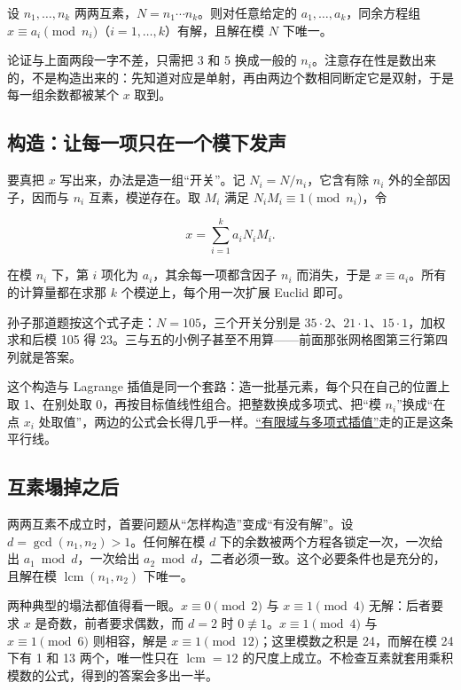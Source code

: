 \begin{theorem}[中国剩余定理]
设 \(n_1,\dots,n_k\) 两两互素，\(N=n_1\cdots n_k\)。则对任意给定的 \(a_1,\dots,a_k\)，同余方程组 \(x\equiv a_i\pmod{n_i}\)（\(i=1,\dots,k\)）有解，且解在模 \(N\) 下唯一。
\end{theorem}

论证与上面两段一字不差，只需把 3 和 5 换成一般的 \(n_i\)。注意存在性是数出来的，不是构造出来的：先知道对应是单射，再由两边个数相同断定它是双射，于是每一组余数都被某个 \(x\) 取到。

\subsection{构造：让每一项只在一个模下发声}

要真把 \(x\) 写出来，办法是造一组``开关''。记 \(N_i=N/n_i\)，它含有除 \(n_i\) 外的全部因子，因而与 \(n_i\) 互素，模逆存在。取 \(M_i\) 满足 \(N_iM_i\equiv1\pmod{n_i}\)，令

\[
x=\sum_{i=1}^{k}a_iN_iM_i.
\]

在模 \(n_i\) 下，第 \(i\) 项化为 \(a_i\)，其余每一项都含因子 \(n_i\) 而消失，于是 \(x\equiv a_i\)。所有的计算量都在求那 \(k\) 个模逆上，每个用一次扩展 Euclid 即可。

孙子那道题按这个式子走：\(N=105\)，三个开关分别是 \(35\cdot2\)、\(21\cdot1\)、\(15\cdot1\)，加权求和后模 105 得 23。三与五的小例子甚至不用算——前面那张网格图第三行第四列就是答案。

\begin{remark}
这个构造与 Lagrange 插值是同一个套路：造一批基元素，每个只在自己的位置上取 1、在别处取 0，再按目标值线性组合。把整数换成多项式、把``模 \(n_i\)''换成``在点 \(x_i\) 处取值''，两边的公式会长得几乎一样。\hyperref[sec:04-Discrete-Mathematics/05-Coding-and-Polynomial-Methods/01]{``有限域与多项式插值''}走的正是这条平行线。
\end{remark}

\subsection{互素塌掉之后}

两两互素不成立时，首要问题从``怎样构造''变成``有没有解''。设 \(d=\gcd(n_1,n_2)>1\)。任何解在模 \(d\) 下的余数被两个方程各锁定一次，一次给出 \(a_1\bmod d\)，一次给出 \(a_2\bmod d\)，二者必须一致。这个必要条件也是充分的，且解在模 \(\operatorname{lcm}(n_1,n_2)\) 下唯一。

两种典型的塌法都值得看一眼。\(x\equiv0\pmod2\) 与 \(x\equiv1\pmod4\) 无解：后者要求 \(x\) 是奇数，前者要求偶数，而 \(d=2\) 时 \(0\not\equiv1\)。\(x\equiv1\pmod4\) 与 \(x\equiv1\pmod6\) 则相容，解是 \(x\equiv1\pmod{12}\)；这里模数之积是 24，而解在模 24 下有 1 和 13 两个，唯一性只在 \(\operatorname{lcm}=12\) 的尺度上成立。不检查互素就套用乘积模数的公式，得到的答案会多出一半。

